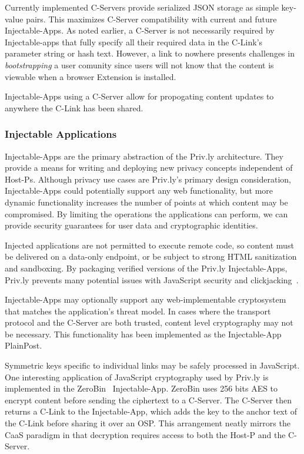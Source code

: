 \documentclass[letterpaper,twocolumn,10pt]{article}
\begin{document}
Currently implemented C-Servers provide serialized JSON storage as simple key-value 
pairs. This maximizes C-Server compatibility with current and future Injectable-Apps.
As noted earlier, a C-Server is not necessarily required by Injectable-apps that 
fully specify all their required data in the C-Link's parameter string or hash text.
However, a link to nowhere presents challenges in \emph{bootstrapping} a user comunity since
users will not know that the content is viewable when a browser Extension is installed.

Injectable-Apps using a C-Server allow for propogating content updates to anywhere the
C-Link has been shared.

\subsubsection{Injectable Applications} \label{sec:privly_injectable_applications}

Injectable-Apps are the primary abstraction of the Priv.ly architecture. They 
provide a means for writing and deploying new privacy concepts independent of 
Host-Ps. Although privacy use cases are Priv.ly's primary design consideration, 
Injectable-Apps could potentially support any web functionality, but more dynamic functionality increases the 
number of points at which content may be compromised. By limiting the operations 
the applications can perform, we can provide security guarantees for user data and 
cryptographic identities.

Injected applications are not permitted to execute remote code, so content must 
be delivered on a data-only endpoint, or be subject to strong HTML sanitization and
sandboxing. 
By packaging verified versions of the Priv.ly Injectable-Apps, Priv.ly prevents many 
potential issues with JavaScript security and clickjacking~\cite{Huang2012}.

Injectable-Apps may optionally support any web-implementable cryptosystem
that matches the application's threat model.
In cases where the transport protocol and the C-Server are 
both trusted, content level cryptography may not be necessary. This 
functionality has been implemented as the Injectable-App PlainPost.

Symmetric keys specific to individual links 
may be safely processed in JavaScript. One interesting application of JavaScript 
cryptography used by Priv.ly is implemented in the ZeroBin~\cite{Sebsauvage2013} 
Injectable-App. ZeroBin uses 256 bits AES to encrypt content before sending the 
ciphertext to a C-Server. The C-Server then returns a C-Link to the 
Injectable-App, which adds the key to the anchor text of the C-Link before sharing 
it over an OSP. This arrangement neatly mirrors the CaaS paradigm in that 
decryption requires access to both the Host-P and the C-Server.
\end{document}
